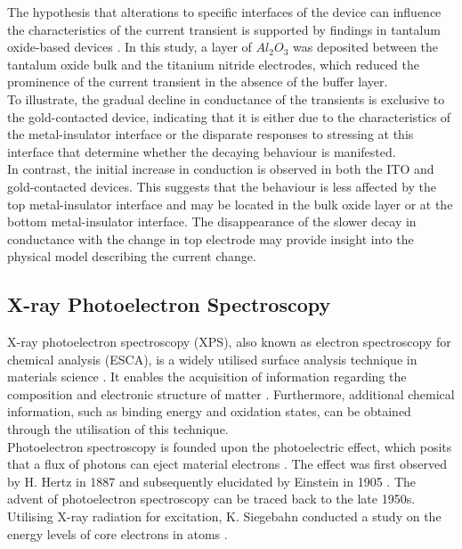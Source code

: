 \noindent The hypothesis that alterations to specific interfaces of the device can influence the characteristics of the current transient is supported by findings in tantalum oxide-based devices \cite{tuller2011point}. In this study, a layer of $Al_2O_3$ was deposited between the tantalum oxide bulk and the titanium nitride electrodes, which reduced the prominence of the current transient in the absence of the buffer layer.\\

\noindent To illustrate, the gradual decline in conductance of the transients is exclusive to the gold-contacted device, indicating that it is either due to the characteristics of the metal-insulator interface or the disparate responses to stressing at this interface that determine whether the decaying behaviour is manifested. \\

\noindent In contrast, the initial increase in conduction is observed in both the ITO and gold-contacted devices. This suggests that the behaviour is less affected by the top metal-insulator interface and may be located in the bulk oxide layer or at the bottom metal-insulator interface. The disappearance of the slower decay in conductance with the change in top electrode may provide insight into the physical model describing the current change. 

\subsection[X-ray Photoelectron Spectroscopy]{X-ray Photoelectron Spectroscopy}

X-ray photoelectron spectroscopy (XPS), also known as electron spectroscopy for chemical analysis (ESCA), is a widely utilised surface analysis technique in materials science \cite{fadley2010x}. It enables the acquisition of information regarding the composition and electronic structure of matter \cite{oswald2006x}. Furthermore, additional chemical information, such as binding energy and oxidation states, can be obtained through the utilisation of this technique. \\

\noindent Photoelectron spectroscopy is founded upon the photoelectric effect, which posits that a flux of photons can eject material electrons \cite{margaritondo1988100}. The effect was first observed by H. Hertz in 1887 \cite{hertz1887ueber} and subsequently elucidated by Einstein in 1905 \cite{einstein1905generation}. The advent of photoelectron spectroscopy can be traced back to the late 1950s. Utilising X-ray radiation for excitation, K. Siegebahn conducted a study on the energy levels of core electrons in atoms \cite{nordling1957precision}. \\

